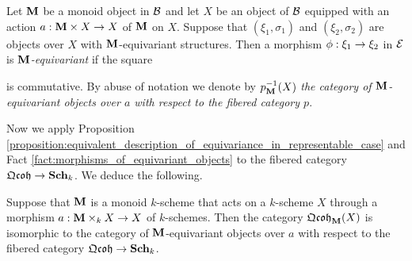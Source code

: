 \begin{definition}
Let $\mathbf{M}$ be a monoid object in ${\mathcal B}$ and let $X$ be an object of ${\mathcal B}$ equipped with an action $a:\mathbf{M}\times X\rightarrow X$ of $\mathbf{M}$ on $X$. Suppose that $(\xi_1,\sigma_1)$ and $(\xi_2,\sigma_2)$ are objects over $X$ with $\mathbf{M}$-equivariant structures. Then a morphism $\phi:\xi_1\rightarrow \xi_2$ in ${\mathcal E}$ is \textit{$\mathbf{M}$-equivariant} if the square
\begin{center}
\end{center}
is commutative. By abuse of notation we denote by $p^{-1}_{\mathbf{M}}(X)$ \textit{the category of $\mathbf{M}$-equivariant objects over $a$ with respect to the fibered category $p$}.
\end{definition}
\noindent
Now we apply Proposition \ref{proposition:equivalent_description_of_equivariance_in_representable_case} and Fact \ref{fact:morphisms_of_equivariant_objects} to the fibered category $\mathfrak{Qcoh}\rightarrow \mathbf{Sch}_k$. We deduce the following.

\begin{corollary}\label{corollary:isomorphism_between_equivariant_quasi_coherent_sheaves_and_equivariant_objects_in_fibered_category_of_quasi_coherent_sheaves}
Suppose that $\mathbf{M}$ is a monoid $k$-scheme that acts on a $k$-scheme $X$ through a morphism $a:\mathbf{M}\times_k X\rightarrow X$ of $k$-schemes. Then the category $\mathfrak{Qcoh}_{\mathbf{M}}(X)$ is isomorphic to the category of $\mathbf{M}$-equivariant objects over $a$ with respect to the fibered category $\mathfrak{Qcoh}\rightarrow \mathbf{Sch}_k$.
\end{corollary}

